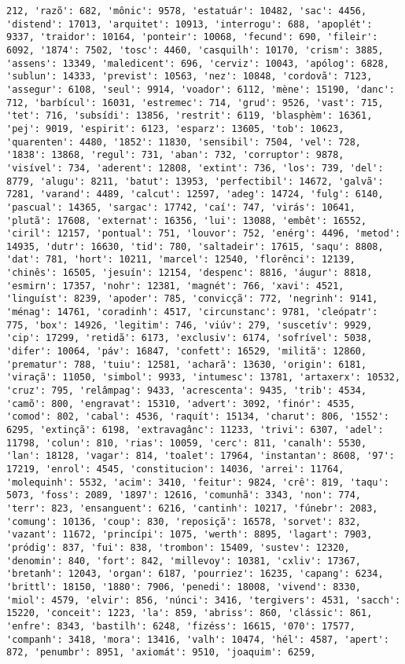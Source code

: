 \documentclass[11pt]{article}
\begin{document}
\begin{Verbatim}[commandchars=\\\{\}]
212, 'razõ': 682, 'mônic': 9578, 'estatuár': 10482, 'sac': 4456, 'distend': 17013, 'arquitet': 10913, 'interrogu': 688, 'apoplét': 9337, 'traidor': 10164, 'ponteir': 10068, 'fecund': 690, 'fileir': 6092, '1874': 7502, 'tosc': 4460, 'casquilh': 10170, 'crism': 3885, 'assens': 13349, 'maledicent': 696, 'cerviz': 10043, 'apólog': 6828, 'sublun': 14333, 'previst': 10563, 'nez': 10848, 'cordovã': 7123, 'assegur': 6108, 'seul': 9914, 'voador': 6112, 'mène': 15190, 'danc': 712, 'barbícul': 16031, 'estremec': 714, 'grud': 9526, 'vast': 715, 'tet': 716, 'subsídi': 13856, 'restrit': 6119, 'blasphèm': 16361, 'pej': 9019, 'espirit': 6123, 'esparz': 13605, 'tob': 10623, 'quarenten': 4480, '1852': 11830, 'sensibil': 7504, 'vel': 728, '1838': 13868, 'regul': 731, 'aban': 732, 'corruptor': 9878, 'visível': 734, 'aderent': 12808, 'extint': 736, 'los': 739, 'del': 8779, 'alugu': 8211, 'batut': 13953, 'perfectibil': 14672, 'galvã': 7281, 'varand': 4489, 'calcut': 12597, 'adeg': 14724, 'fulg': 6140, 'pascual': 14365, 'sargac': 17742, 'caí': 747, 'virás': 10641, 'plutã': 17608, 'externat': 16356, 'lui': 13088, 'embêt': 16552, 'ciril': 12157, 'pontual': 751, 'louvor': 752, 'enérg': 4496, 'metod': 14935, 'dutr': 16630, 'tid': 780, 'saltadeir': 17615, 'saqu': 8808, 'dat': 781, 'hort': 10211, 'marcel': 12540, 'florênci': 12139, 'chinês': 16505, 'jesuín': 12154, 'despenc': 8816, 'áugur': 8818, 'esmirn': 17357, 'nohr': 12381, 'magnét': 766, 'xavi': 4521, 'linguíst': 8239, 'apoder': 785, 'convicçã': 772, 'negrinh': 9141, 'ménag': 14761, 'coradinh': 4517, 'circunstanc': 9781, 'cleópatr': 775, 'box': 14926, 'legitim': 746, 'viúv': 279, 'suscetív': 9929, 'cip': 17299, 'retidã': 6173, 'exclusiv': 6174, 'sofrível': 5038, 'difer': 10064, 'páv': 16847, 'confett': 16529, 'militã': 12860, 'prematur': 788, 'tuiu': 12581, 'acharã': 13630, 'origin': 6181, 'viraçã': 11050, 'simbol': 9933, 'intumesc': 13781, 'artaxerx': 10532, 'cruz': 795, 'relâmpag': 9433, 'acrescenta': 9435, 'trib': 4534, 'camõ': 800, 'engravat': 15310, 'advert': 3092, 'finór': 4535, 'comod': 802, 'cabal': 4536, 'raquít': 15134, 'charut': 806, '1552': 6295, 'extinçã': 6198, 'extravagânc': 11233, 'trivi': 6307, 'adel': 11798, 'colun': 810, 'rias': 10059, 'cerc': 811, 'canalh': 5530, 'lan': 18128, 'vagar': 814, 'toalet': 17964, 'instantan': 8608, '97': 17219, 'enrol': 4545, 'constitucion': 14036, 'arrei': 11764, 'molequinh': 5532, 'acim': 3410, 'feitur': 9824, 'crê': 819, 'taqu': 5073, 'foss': 2089, '1897': 12616, 'comunhã': 3343, 'non': 774, 'terr': 823, 'ensanguent': 6216, 'cantinh': 10217, 'fúnebr': 2083, 'comung': 10136, 'coup': 830, 'reposiçã': 16578, 'sorvet': 832, 'vazant': 11672, 'princípi': 1075, 'werth': 8895, 'lagart': 7903, 'pródig': 837, 'fui': 838, 'trombon': 15409, 'sustev': 12320, 'denomin': 840, 'fort': 842, 'millevoy': 10381, 'cxliv': 17367, 'bretanh': 12043, 'organ': 6187, 'pourriez': 16235, 'capang': 6234, 'brittl': 18150, '1880': 7906, 'penedi': 18008, 'vivend': 8330, 'miol': 4579, 'elvir': 856, 'núnci': 3416, 'tergivers': 4531, 'sacch': 15220, 'conceit': 1223, 'la': 859, 'abriss': 860, 'clássic': 861, 'enfre': 8343, 'bastilh': 6248, 'fizéss': 16615, '070': 17577, 'companh': 3418, 'mora': 13416, 'valh': 10474, 'hél': 4587, 'apert': 872, 'penumbr': 8951, 'axiomát': 9510, 'joaquim': 6259, 
\end{Verbatim}
\end{document}
